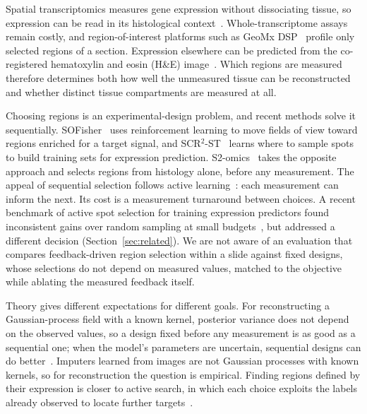 \documentclass[10pt]{article}
\begin{document}
Spatial transcriptomics measures gene expression without dissociating tissue, so expression can be read in its
histological context~\citep{stahl2016visualization,rao2021exploring,moses2022museum}. Whole-transcriptome assays
remain costly, and region-of-interest platforms such as GeoMx DSP~\citep{merritt2020geomx} profile only selected
regions of a section. Expression elsewhere can be predicted from the co-registered hematoxylin and eosin (H\&E)
image~\citep{xie2023bleep,jaume2024hest}. Which regions are measured therefore determines both how well the
unmeasured tissue can be reconstructed and whether distinct tissue compartments are measured at all.

Choosing regions is an experimental-design problem, and recent methods solve it sequentially.
SOFisher~\citep{li2026sofisher} uses reinforcement learning to move fields of view toward regions enriched for a
target signal, and SCR$^2$-ST~\citep{zhu2026scr2st} learns where to sample spots to build training sets for
expression prediction. S2-omics~\citep{yuan2025s2omics} takes the opposite approach and selects regions from
histology alone, before any measurement. The appeal of sequential selection follows active learning~\citep{settles2009active}: each measurement
can inform the next. Its cost is a measurement turnaround between choices. A recent benchmark of active spot
selection for training expression predictors found inconsistent gains over random sampling at small
budgets~\citep{zhu2026benchmarking}, but addressed a different decision (Section~\ref{sec:related}). We are not
aware of an evaluation that compares feedback-driven region selection within a slide against fixed designs, whose
selections do not depend on measured values, matched to the objective while ablating the measured feedback itself.

Theory gives different expectations for different goals. For reconstructing a Gaussian-process field with a
known kernel, posterior variance does not depend on the observed values, so a design fixed before any measurement
is as good as a sequential one; when the model's parameters are uncertain, sequential designs can do
better~\citep{krause2008near,rainforth2024modern}. Imputers learned from images are not Gaussian processes with known kernels, so for
reconstruction the question is empirical. Finding regions defined by their expression is closer to active search,
in which each choice exploits the labels already observed to locate further targets~\citep{garnett2012bayesian}.
\end{document}
